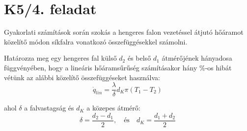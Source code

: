 

\section*{K5/4. feladat}
Gyakorlati számítások során szokás a hengeres falon vezetéssel átjutó hőáramot közelítő módon síkfalra vonatkozó összefüggésekkel számolni.

Határozza meg egy hengeres fal külső $d_2$ és belső $d_1$ átmérőjének hányadosa függvényében, hogy a lineáris hőáramsűrűség számításakor hány \%-os hibát vétünk az alábbi közelítő összefüggéseket használva:
\begin{equation}
	\dot{q}_{lin} = \dfrac{\lambda}{\delta} d_K \pi \left(T_1 - T_2\right)
\end{equation}

ahol $\delta$ a falvastagság és $d_K$ a közepes átmérő:
\begin{equation}
	\delta = \dfrac{d_2 - d_1}{2}, \quad \text{és} \quad d_K = \dfrac{d_1 + d_2}{2}
\end{equation}

